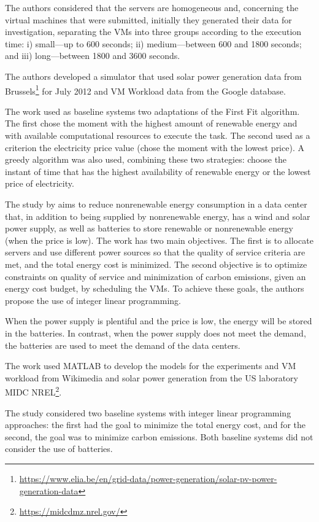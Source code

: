 \documentclass[12pt,a4paper]{article}
\begin{document}
The authors considered that the servers are homogeneous and, concerning the virtual machines that were submitted, initially they generated their data for investigation, separating the VMs into three groups according to the execution time: i) small---up to 600 seconds; ii) medium---between 600 and 1800 seconds; and iii) long---between 1800 and 3600 seconds.

The authors developed a simulator that used solar power generation data from Brussels\footnote{\url{https://www.elia.be/en/grid-data/power-generation/solar-pv-power-generation-data}} for July 2012 and VM Workload data from the Google database.

The work used as baseline systems two adaptations of the First Fit algorithm. The first chose the moment with the highest amount of renewable energy and with available computational resources to execute the task. The second used as a criterion the electricity price value  (chose the moment with the lowest price). A greedy algorithm was also used, combining these two strategies: choose the instant of time that has the highest availability of renewable energy or the lowest price of electricity.


The study by \citet{gu2016} aims to reduce nonrenewable energy consumption in a data center that, in addition to being supplied by nonrenewable energy, has a wind and solar power supply, as well as batteries to store renewable or nonrenewable energy (when the price is low). The work has two main objectives. The first is to allocate servers and use different power sources so that the quality of service criteria are met, and the total energy cost is minimized. The second objective is to optimize constraints on quality of service and minimization of carbon emissions, given an energy cost budget,  by scheduling the VMs. To achieve these goals, the authors propose the use of integer linear programming.

When the power supply is plentiful and the price is low, the energy will be stored in the batteries. In contrast, when the power supply does not meet the demand, the batteries are used to meet the demand of the data centers.

The work used MATLAB to develop the models for the experiments and VM workload from Wikimedia and solar power generation from the US laboratory MIDC NREL\footnote{\url{https://midcdmz.nrel.gov/}}.

The study considered two baseline systems with integer linear programming approaches: the first had the goal to minimize the total energy cost, and for the second, the goal was to minimize carbon emissions. Both baseline systems did not consider the use of batteries.
\end{document}
